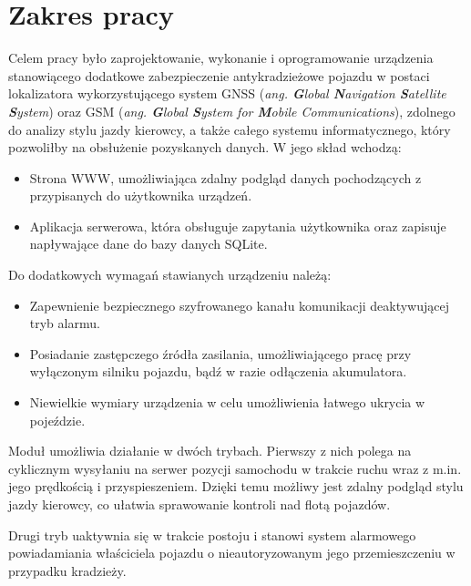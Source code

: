 \section{Zakres pracy}
\label{project_sketch}
Celem pracy było zaprojektowanie, wykonanie i oprogramowanie urządzenia stanowiącego dodatkowe zabezpieczenie antykradzieżowe pojazdu w postaci lokalizatora wykorzystującego system GNSS (\textit{ang. \textbf{G}lobal \textbf{N}avigation \textbf{S}atellite \textbf{S}ystem}) oraz GSM (\textit{ang. \textbf{G}lobal \textbf{S}ystem for \textbf{M}obile Communications}), zdolnego do analizy stylu jazdy kierowcy, a także całego systemu informatycznego, który pozwoliłby na obsłużenie pozyskanych danych. W jego skład wchodzą:

\begin{itemize}
\item Strona WWW, umożliwiająca zdalny podgląd danych pochodzących z przypisanych do użytkownika urządzeń.
\item Aplikacja serwerowa, która obsługuje zapytania użytkownika oraz zapisuje napływające dane do bazy danych SQLite.
\end{itemize}

Do dodatkowych wymagań stawianych urządzeniu należą:

\begin{itemize}
\item Zapewnienie bezpiecznego szyfrowanego kanału komunikacji deaktywującej tryb alarmu.
\item Posiadanie zastępczego źródła zasilania, umożliwiającego pracę przy wyłączonym silniku pojazdu, bądź w razie odłączenia akumulatora.
\item Niewielkie wymiary urządzenia w celu umożliwienia łatwego ukrycia w pojeździe. 
\end{itemize}

Moduł umożliwia działanie w dwóch trybach. Pierwszy z nich polega na cyklicznym wysyłaniu na serwer pozycji samochodu w trakcie ruchu wraz z m.in. jego prędkością i przyspieszeniem. Dzięki temu możliwy jest zdalny podgląd stylu jazdy kierowcy, co ułatwia sprawowanie kontroli nad flotą pojazdów.

Drugi tryb uaktywnia się w trakcie postoju i stanowi system alarmowego powiadamiania właściciela pojazdu o nieautoryzowanym jego przemieszczeniu w przypadku kradzieży.

